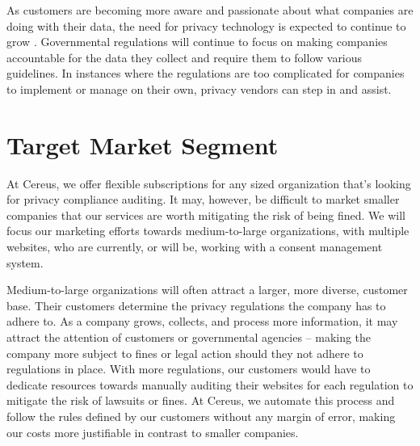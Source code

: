 As customers are becoming more aware and passionate about what companies are doing with their data, the need for privacy technology is expected to continue to grow \cite{meehan.forbes.2019}. Governmental regulations will continue to focus on making companies accountable for the data they collect and require them to follow various guidelines. In instances where the regulations are too complicated for companies to implement or manage on their own, privacy vendors can step in and assist.

\section{Target Market Segment}

At Cereus, we offer flexible subscriptions for any sized organization that's looking for privacy compliance auditing. It may, however, be difficult to market smaller companies that our services are worth mitigating the risk of being fined. We will focus our marketing efforts towards medium-to-large organizations, with multiple websites, who are currently, or will be, working with a consent management system. 

Medium-to-large organizations will often attract a larger, more diverse, customer base. Their customers determine the privacy regulations the company has to adhere to. As a company grows, collects, and process more information, it may attract the attention of customers or governmental agencies -- making the company more subject to fines or legal action should they not adhere to regulations in place. With more regulations, our customers would have to dedicate resources towards manually auditing their websites for each regulation to mitigate the risk of lawsuits or fines. At Cereus, we automate this process and follow the rules defined by our customers without any margin of error, making our costs more justifiable in contrast to smaller companies.


